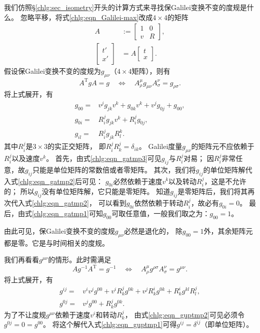 我们仿照\S\ref{chlg:sec_isometry}开头的计算方式来寻找保Galilei变换不变的度规是什么。
忽略平移，将式\eqref{chlg:eqn_Galilei-max}改成$4\times 4$的矩阵
\begin{equation}
\begin{aligned}
    A&:=\begin{bmatrix}  1 & 0  \\ v & R   \end{bmatrix},\\
    \begin{bmatrix}  t' \\ x'   \end{bmatrix}&=A\begin{bmatrix}  t \\ x  \end{bmatrix}.
\end{aligned}
\end{equation}
假设保Galilei变换不变的度规为$g_{\mu\nu}$（$4\times 4$矩阵），则有
\begin{equation}
	A^{\mathrm{T}} g A = g \quad \Leftrightarrow \quad
	A^{\mu}_{\rho} g_{\mu\nu} A^{\nu}_{\sigma} = g_{\rho\sigma}.
\end{equation}
将上式展开，有
\begin{align}
	g_{00} = & v^j g_{jk} v^k + g_{0k} v^k + v^j g_{0j} + g_{00}, \label{chlg:eqn_gatmp1} \\
	g_{0i} = & R^{j}_{i} g_{jk} v^k + R^j_{i} g_{0j}, \label{chlg:eqn_gatmp2} \\
	g_{il} = & R^j_{i} g_{jk} R^k_{l} . \label{chlg:eqn_gatmp3}
\end{align}
其中$R^{j}_{i}$是$3\times 3$的实正交矩阵，
即$R^{j}_{i} R^{j}_{k} =\delta_{ik}$。
Galilei度量$g_{\mu\nu}$的矩阵元不应依赖于$R^{j}_{i}$以及速度$v^k$。
首先，由式\eqref{chlg:eqn_gatmp3}可见$g_{ij}$与$R^{j}_{i}$对易；
因$R^{j}_{i}$非常任意，故$g_{ij}$只能是单位矩阵的常数倍或者零矩阵。
其次，我们将$g_{ij}$的单位矩阵解代入式\eqref{chlg:eqn_gatmp2}后可见：
$g_{0i}$必然依赖于速度$v^k$以及转动$R^{j}_{i}$，这是不允许的；
所以$g_{ij}$没有单位矩阵解，它只能是零矩阵。
知道$g_{ij}$是零矩阵后，我们将其再次代入式\eqref{chlg:eqn_gatmp2}，
可以看到$g_{0i}$依然依赖于转动$R^{j}_{i}$，故必有$g_{0i}=0$。
最后，由式\eqref{chlg:eqn_gatmp1}可知$g_{00}$可取任意值，一般我们取之为：$g_{00}=1$。

由此可见，保Galilei变换不变的度规$g_{\mu\nu}$必然是退化的，
除$g_{00}=1$外，其余矩阵元都是零。它是与时间相关的度规。

我们再看看$g^{\mu\nu}$的情形。此时需满足
\begin{equation}
	A g^{-1} A^{\mathrm{T}} = g^{-1} \quad \Leftrightarrow \quad
	A^{\mu}_{\rho} g^{\rho\sigma} A^{\nu}_{\sigma} = g^{\mu\nu}.
\end{equation}
将上式展开，有
\begin{align}
    g^{i j}= & v^i v^j g^{00}+ v^{i} R^{j}_{k } g^{0 k} + v^{j} R^{i}_{ k} g^{0 k}
     +R^i_{k} g^{kl} R^j_{l} , \label{chlg:eqn_guptmp1} \\
	g^{0 j}= & v^j g^{00}+R^j_{k} g^{0 k} . \label{chlg:eqn_guptmp2}
\end{align}
为了不让度规$g^{\mu\nu}$依赖于速度$v^i$和转动$R^j_{k}$，
由式\eqref{chlg:eqn_guptmp2}可见必须令$g^{0j}=0=g^{00}$。
将这个解代入式\eqref{chlg:eqn_guptmp1}可得$g^{ij}=\delta^{ij}$（即单位矩阵）。


